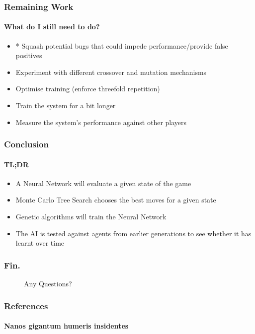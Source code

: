 \documentclass[aspectratio=169]{beamer}
\begin{document}
\begin{frame}
	\frametitle{Remaining Work}
	\framesubtitle{What do I still need to do?}
	\begin{itemize}
		\item * Squash potential bugs that could impede performance/provide false positives
		\item Experiment with different crossover and mutation mechanisms
		\item Optimise training (enforce threefold repetition)
		\item Train the system for a bit longer
		\item Measure the system's performance against other players
	\end{itemize}
\end{frame}

\begin{frame}
	\frametitle{Conclusion}
	\framesubtitle{TL;DR}

	\begin{itemize}
		\item A Neural Network will evaluate a given state of the game
		\item Monte Carlo Tree Search chooses the best moves for a given state
		\item Genetic algorithms will train the Neural Network
		\item The AI is tested against agents from earlier generations to see whether it has learnt over time
	\end{itemize}
\end{frame}


\begin{frame}
	\frametitle{Fin.}
	
	\begin{figure}
		\LARGE
	Any Questions?
	\end{figure}
\end{frame}

\begin{frame}
	\frametitle{References}
	\framesubtitle{Nanos gigantum humeris insidentes}


	
	{
		\tiny
		
		
	}


\end{frame}
\end{document}
